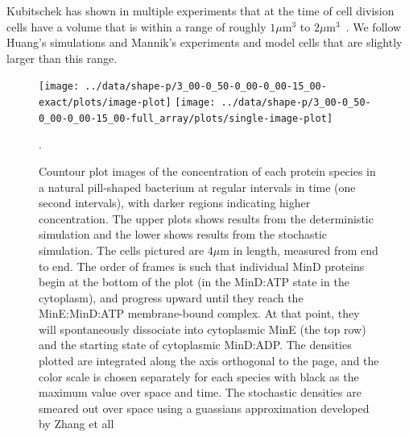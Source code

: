 \documentclass[letterpaper,twocolumn,amsmath,amssymb,pre]{revtex4-1}
\newcommand\micron{\ensuremath{\mu\text{m}}}
\begin{document}

Kubitschek has shown in multiple experiments that at the time of cell
division cells have a volume that is within a range of roughly
$1\micron^3$ to $2\micron^3$~\cite{kubitschek1990cell,
  kubitschek1968linear}.  We follow Huang's
simulations\cite{huang2003dynamic} and Mannik's experiments and model
cells that are slightly larger than this range.

\begin{figure}
  \texttt{[image: ../data/shape-p/3\_00-0\_50-0\_00-0\_00-15\_00-exact/plots/image-plot]}
  \texttt{[image: ../data/shape-p/3\_00-0\_50-0\_00-0\_00-15\_00-full\_array/plots/single-image-plot]}
  \caption{Countour plot images of the concentration of each protein
    species in a natural pill-shaped bacterium at regular intervals in
    time (one second intervals), with darker regions indicating higher
    concentration. The upper plots shows results from the
    deterministic simulation and the lower shows results from the
    stochastic simulation.  The cells pictured are $4\micron$ in
    length, measured from end to end.  The order of frames is such
    that individual MinD proteins begin at the bottom of the plot (in
    the MinD:ATP state in the cytoplasm), and progress upward until
    they reach the MinE:MinD:ATP membrane-bound complex.  At that
    point, they will spontaneously dissociate into cytoplasmic MinE
    (the top row) and the starting state of cytoplasmic MinD:ADP.  The
    densities plotted are integrated along the axis orthogonal to the
    page, and the color scale is chosen separately for each species
    with black as the maximum value over space and time.  The
    stochastic densities are smeared out over space using a guassians
    approximation developed by Zhang et all~\cite{zhang2007gaussian}}.
  \label{image-p}
\end{figure}
\end{document}
